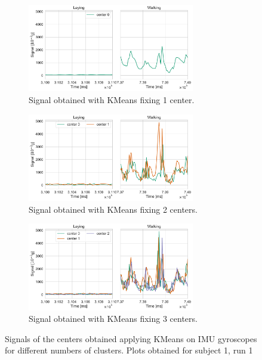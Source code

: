 \documentclass[10pt, a4paper, twocolumn]{article}
\theoremstyle{definition}
\begin{document}
\begin{figure} \centering
\begin{subfigure}{\textwidth}\centering
         \includegraphics[width=0.8\textwidth]{../clustering/clustering_results_euclidean/subject_1/run_1/IMU_gyro1_centers.pdf}
         \caption{Signal obtained with KMeans fixing 1 center.}\label{fig:imgyro1}
     \end{subfigure}
     
\begin{subfigure}{\textwidth}\centering
         \includegraphics[width=0.8\textwidth]{../clustering/clustering_results_euclidean/subject_1/run_1/IMU_gyro2_centers.pdf}
         \caption{Signal obtained with KMeans fixing 2 centers.}\label{fig:imgyro2}
     \end{subfigure}
     
\begin{subfigure}{\textwidth}\centering
         \includegraphics[width=0.8\textwidth]{../clustering/clustering_results_euclidean/subject_1/run_1/IMU_gyro3_centers.pdf}
         \caption{Signal obtained with KMeans fixing 3 centers.}\label{fig:imgyro3}
     \end{subfigure}
     
  \caption{Signals of the centers obtained applying KMeans on IMU gyroscopes for different numbers of clusters. Plots obtained for subject 1, run 1}\label{fig:imugyro}
\end{figure}
\end{document}

